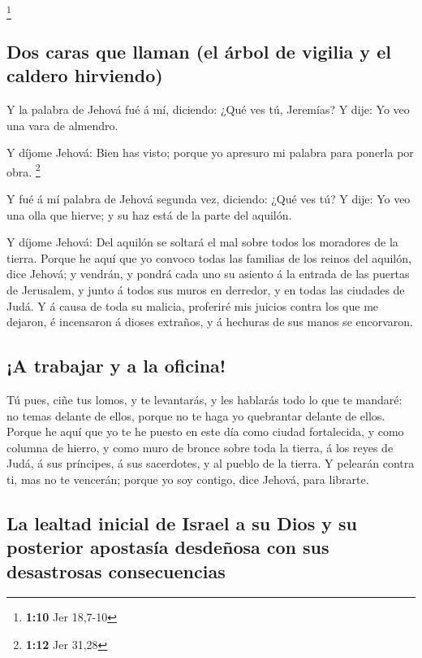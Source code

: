 \footnote{\textbf{1:10} Jer 18,7-10}

\hypertarget{dos-caras-que-llaman-el-uxe1rbol-de-vigilia-y-el-caldero-hirviendo}{%
\subsection{Dos caras que llaman (el árbol de vigilia y el caldero
hirviendo)}\label{dos-caras-que-llaman-el-uxe1rbol-de-vigilia-y-el-caldero-hirviendo}}

 Y la palabra de Jehová fué á mí, diciendo: ¿Qué ves tú,
Jeremías? Y dije: Yo veo una vara de almendro.

 Y díjome Jehová: Bien has visto; porque yo apresuro mi
palabra para ponerla por obra. \footnote{\textbf{1:12} Jer 31,28}

 Y fué á mí palabra de Jehová segunda vez, diciendo: ¿Qué
ves tú? Y dije: Yo veo una olla que hierve; y su haz está de la parte
del aquilón.

 Y díjome Jehová: Del aquilón se soltará el mal sobre todos
los moradores de la tierra.  Porque he aquí que yo convoco
todas las familias de los reinos del aquilón, dice Jehová; y vendrán, y
pondrá cada uno su asiento á la entrada de las puertas de Jerusalem, y
junto á todos sus muros en derredor, y en todas las ciudades de Judá.
 Y á causa de toda su malicia, proferiré mis juicios contra
los que me dejaron, é incensaron á dioses extraños, y á hechuras de sus
manos se encorvaron.

\hypertarget{a-trabajar-y-a-la-oficina}{%
\subsection{¡A trabajar y a la
oficina!}\label{a-trabajar-y-a-la-oficina}}

 Tú pues, ciñe tus lomos, y te levantarás, y les hablarás
todo lo que te mandaré: no temas delante de ellos, porque no te haga yo
quebrantar delante de ellos.  Porque he aquí que yo te he
puesto en este día como ciudad fortalecida, y como columna de hierro, y
como muro de bronce sobre toda la tierra, á los reyes de Judá, á sus
príncipes, á sus sacerdotes, y al pueblo de la tierra.  Y
pelearán contra ti, mas no te vencerán; porque yo soy contigo, dice
Jehová, para librarte.

\hypertarget{la-lealtad-inicial-de-israel-a-su-dios-y-su-posterior-apostasuxeda-desdeuxf1osa-con-sus-desastrosas-consecuencias}{%
\subsection{La lealtad inicial de Israel a su Dios y su posterior
apostasía desdeñosa con sus desastrosas
consecuencias}\label{la-lealtad-inicial-de-israel-a-su-dios-y-su-posterior-apostasuxeda-desdeuxf1osa-con-sus-desastrosas-consecuencias}}

